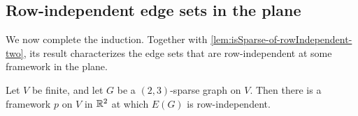 \subsection{Row-independent edge sets in the plane}
\label{sec:rigidity-matroid-hard-direction}

We now complete the induction. Together with
\cref{lem:isSparse-of-rowIndependent-two}, its result characterizes the
edge sets that are row-independent at some framework in the plane.

\begin{theorem}
  \label{thm:isSparse-exists-rowIndependent-placement}
  \leanok
  Let $V$ be finite, and let $G$ be a $(2, 3)$-sparse graph on $V$.
  Then there is a framework $p$ on $V$ in ${\mathbb{R}}^{2}$ at which $E(G)$ is
  row-independent.
\end{theorem}
